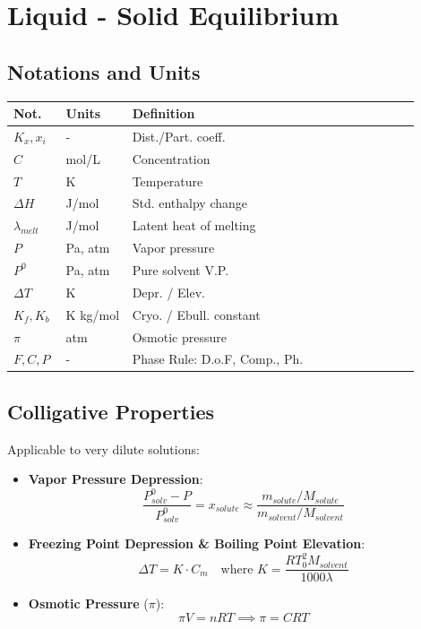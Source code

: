 \section{Liquid - Solid Equilibrium}

\subsection{Notations and Units}
\begin{center}
\begin{tabular}{p{0.1\linewidth} p{0.15\linewidth} p{0.65\linewidth}}
\toprule
\textbf{Not.} & \textbf{Units} & \textbf{Definition} \\
\midrule
$K_x, x_i$ & - & Dist./Part. coeff. \\
$C$ & mol/L & Concentration \\
$T$ & K & Temperature \\
$\Delta H$ & J/mol & Std. enthalpy change \\
$\lambda_{melt}$ & J/mol & Latent heat of melting \\
$P$ & Pa, atm & Vapor pressure \\
$P^0$ & Pa, atm & Pure solvent V.P. \\
$\Delta T$ & K & Depr. / Elev. \\
$K_f, K_b$ & K kg/mol & Cryo. / Ebull. constant \\
$\pi$ & atm & Osmotic pressure \\
$F, C, P$ & - & Phase Rule: D.o.F, Comp., Ph. \\
\bottomrule
\end{tabular}
\end{center}

\subsection{Colligative Properties}
Applicable to very dilute solutions:
\begin{itemize}
    \item \textbf{Vapor Pressure Depression}:
    \begin{equation}
        \frac{P_{solv}^0 - P}{P_{solv}^0} = x_{solute} \approx \frac{m_{solute}/M_{solute}}{m_{solvent}/M_{solvent}}
    \end{equation}
    \item \textbf{Freezing Point Depression \& Boiling Point Elevation}:
    \begin{equation}
        \Delta T = K \cdot C_m \quad \text{where } K = \frac{R T_0^2 M_{solvent}}{1000 \lambda}
    \end{equation}
    \item \textbf{Osmotic Pressure} ($\pi$):
    \begin{equation}
        \pi V = nRT \implies \pi = CRT
    \end{equation}
\end{itemize}

